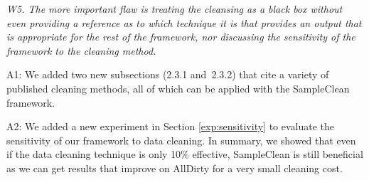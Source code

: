 \vspace{.5em}



\mbox{}

\emph{W5. The more important flaw is treating the cleansing as a black box without even providing a reference as to which technique it is that provides an output that is appropriate for the rest of the framework, nor discussing the sensitivity of the framework to the cleaning method.}



A1: We added two new subsections (2.3.1 and~2.3.2) that cite a variety of published cleaning methods, all of which
can be applied with the SampleClean framework.


A2: We added a new experiment in Section \ref{exp:sensitivity} to evaluate the sensitivity of our framework to data cleaning. In summary, we showed that even if the data cleaning technique is only 10\% effective, SampleClean is still beneficial as we can get results that improve on AllDirty for a very small cleaning cost. 








%

%
